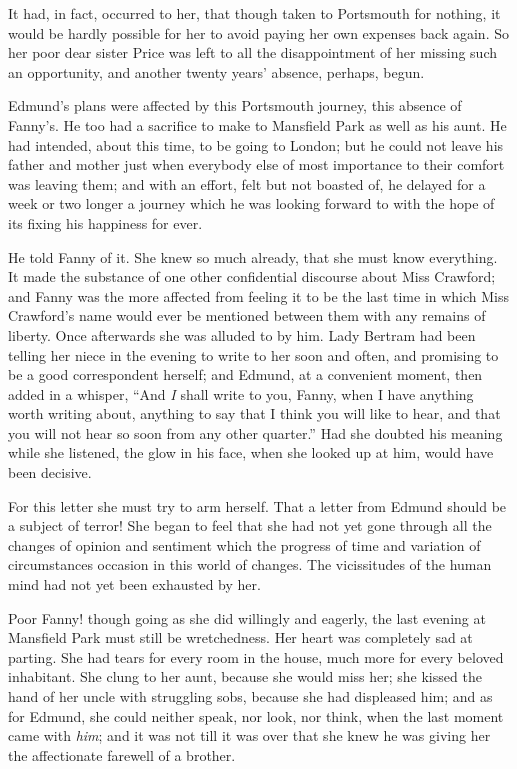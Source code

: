 \documentclass{article}
\begin{document}
It had, in fact, occurred to her, that though taken
to Portsmouth for nothing, it would be hardly possible
for her to avoid paying her own expenses back again.
So her poor dear sister Price was left to all the
disappointment of her missing such an opportunity,
and another twenty years' absence, perhaps, begun.

Edmund's plans were affected by this Portsmouth journey,
this absence of Fanny's. He too had a sacrifice to make
to Mansfield Park as well as his aunt.  He had intended,
about this time, to be going to London; but he could
not leave his father and mother just when everybody else
of most importance to their comfort was leaving them;
and with an effort, felt but not boasted of, he delayed
for a week or two longer a journey which he was looking
forward to with the hope of its fixing his happiness
for ever.

He told Fanny of it.  She knew so much already,
that she must know everything.  It made the substance
of one other confidential discourse about Miss Crawford;
and Fanny was the more affected from feeling it to be
the last time in which Miss Crawford's name would ever
be mentioned between them with any remains of liberty.
Once afterwards she was alluded to by him.  Lady Bertram had
been telling her niece in the evening to write to her soon
and often, and promising to be a good correspondent herself;
and Edmund, at a convenient moment, then added in a whisper,
``And \emph{I} shall write to you, Fanny, when I have anything
worth writing about, anything to say that I think you
will like to hear, and that you will not hear so soon
from any other quarter.''  Had she doubted his meaning
while she listened, the glow in his face, when she looked
up at him, would have been decisive.

For this letter she must try to arm herself.  That a
letter from Edmund should be a subject of terror!
She began to feel that she had not yet gone through all
the changes of opinion and sentiment which the progress
of time and variation of circumstances occasion in this
world of changes.  The vicissitudes of the human mind
had not yet been exhausted by her.

Poor Fanny! though going as she did willingly and eagerly,
the last evening at Mansfield Park must still
be wretchedness.  Her heart was completely sad at parting.
She had tears for every room in the house, much more
for every beloved inhabitant.  She clung to her aunt,
because she would miss her; she kissed the hand of her
uncle with struggling sobs, because she had displeased him;
and as for Edmund, she could neither speak, nor look,
nor think, when the last moment came with \emph{him}; and it
was not till it was over that she knew he was giving
her the affectionate farewell of a brother.
\end{document}

